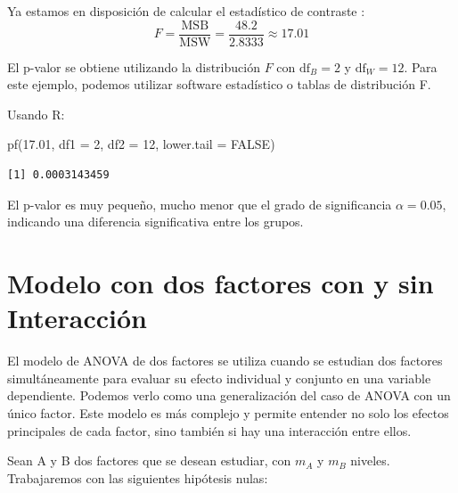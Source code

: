 \documentclass[
  letterpaper,
  DIV=11,
  numbers=noendperiod]{scrreprt}
\newenvironment{Shaded}{\begin{snugshade}}{\end{snugshade}}
\newcommand{\AttributeTok}[1]{\textcolor[rgb]{0.40,0.45,0.13}{#1}}
\newcommand{\ConstantTok}[1]{\textcolor[rgb]{0.56,0.35,0.01}{#1}}
\newcommand{\DecValTok}[1]{\textcolor[rgb]{0.68,0.00,0.00}{#1}}
\newcommand{\FloatTok}[1]{\textcolor[rgb]{0.68,0.00,0.00}{#1}}
\newcommand{\FunctionTok}[1]{\textcolor[rgb]{0.28,0.35,0.67}{#1}}
\newcommand{\NormalTok}[1]{\textcolor[rgb]{0.00,0.23,0.31}{#1}}
\begin{document}
\begin{tcolorbox}
Ya estamos en disposición de calcular el estadístico de contraste : \[
F = \frac{\text{MSB}}{\text{MSW}} = \frac{48.2}{2.8333} \approx 17.01
\]

El p-valor se obtiene utilizando la distribución \(F\) con
\(\text{df}_B = 2\) y \(\text{df}_W = 12\). Para este ejemplo, podemos
utilizar software estadístico o tablas de distribución F.

Usando R:

\begin{Shaded}
\begin{Highlighting}[]
\FunctionTok{pf}\NormalTok{(}\FloatTok{17.01}\NormalTok{, }\AttributeTok{df1 =} \DecValTok{2}\NormalTok{, }\AttributeTok{df2 =} \DecValTok{12}\NormalTok{, }\AttributeTok{lower.tail =} \ConstantTok{FALSE}\NormalTok{)}
\end{Highlighting}
\end{Shaded}

\begin{verbatim}
[1] 0.0003143459
\end{verbatim}

El p-valor es muy pequeño, mucho menor que el grado de significancia
\(\alpha=0.05\), indicando una diferencia significativa entre los
grupos.

\end{tcolorbox}

\hypertarget{modelo-con-dos-factores-con-y-sin-interacciuxf3n}{%
\section{Modelo con dos factores con y sin
Interacción}\label{modelo-con-dos-factores-con-y-sin-interacciuxf3n}}

El modelo de ANOVA de dos factores se utiliza cuando se estudian dos
factores simultáneamente para evaluar su efecto individual y conjunto en
una variable dependiente. Podemos verlo como una generalización del caso
de ANOVA con un único factor. Este modelo es más complejo y permite
entender no solo los efectos principales de cada factor, sino también si
hay una interacción entre ellos.

Sean A y B dos factores que se desean estudiar, con \(m_A\) y \(m_B\)
niveles. Trabajaremos con las siguientes hipótesis nulas:
\end{document}
